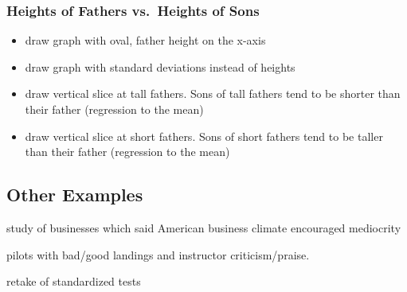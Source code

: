 \documentclass[letterpaper, landscape]{exam}
\begin{document}
  \subsubsection{Heights of Fathers vs.\ Heights of Sons} %

  \begin{itemize}
    \item draw graph with oval, father height on the x-axis
    \item draw graph with standard deviations instead of heights
    \item draw vertical slice at tall fathers. Sons of tall fathers tend to be
      shorter than their father (regression to the mean)
    \item draw vertical slice at short fathers. Sons of short fathers tend to be
      taller than their father (regression to the mean)
  \end{itemize}
  
  \subsection{Other Examples} %
  
  \begin{itemize*}
    \item study of businesses which said American business climate encouraged
      mediocrity
    \item pilots with bad/good landings and instructor criticism/praise.
    \item retake of standardized tests
  \end{itemize*}
\end{document}
